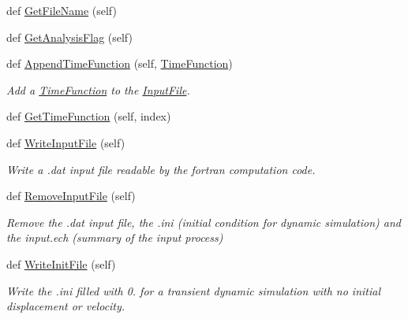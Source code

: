\begin{DoxyCompactItemize}
def \hyperlink{classgebtaero_1_1_input_file_1_1_input_file_a3fe8f05410f29d9c555adbee5dae9e16}{Get\+File\+Name} (self)
\item 
def \hyperlink{classgebtaero_1_1_input_file_1_1_input_file_a8d9a4bed8ff821455af85d5440329fe8}{Get\+Analysis\+Flag} (self)
\item 
def \hyperlink{classgebtaero_1_1_input_file_1_1_input_file_a3cf4d7178dc0471896e7c60f6c17e906}{Append\+Time\+Function} (self, \hyperlink{classgebtaero_1_1_time_function_1_1_time_function}{Time\+Function})
\begin{DoxyCompactList}\small\item\em Add a \hyperlink{namespacegebtaero_1_1_time_function}{Time\+Function} to the \hyperlink{classgebtaero_1_1_input_file_1_1_input_file}{Input\+File}. \end{DoxyCompactList}\item 
def \hyperlink{classgebtaero_1_1_input_file_1_1_input_file_a5d53bb9ae864d002dfbbee1231b91881}{Get\+Time\+Function} (self, index)
\item 
def \hyperlink{classgebtaero_1_1_input_file_1_1_input_file_aff90830e65ba0e25b330c595a94a7a82}{Write\+Input\+File} (self)
\begin{DoxyCompactList}\small\item\em Write a .dat input file readable by the fortran computation code. \end{DoxyCompactList}\item 
def \hyperlink{classgebtaero_1_1_input_file_1_1_input_file_a5c0e5660a7e8a816f2fe3b712480306a}{Remove\+Input\+File} (self)
\begin{DoxyCompactList}\small\item\em Remove the .dat input file, the .ini (initial condition for dynamic simulation) and the input.\+ech (summary of the input process) \end{DoxyCompactList}\item 
def \hyperlink{classgebtaero_1_1_input_file_1_1_input_file_a0138cdf368f06be59a355955c737a3c3}{Write\+Init\+File} (self)
\begin{DoxyCompactList}\small\item\em Write the .ini filled with 0. for a transient dynamic simulation with no initial displacement or velocity. \end{DoxyCompactList}\end{DoxyCompactItemize}
